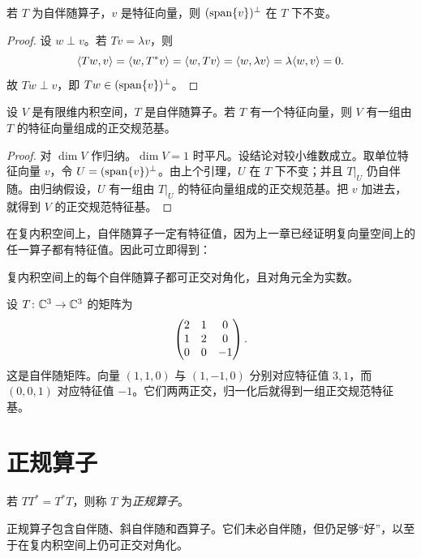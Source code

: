 \begin{lemma}
若 $T$ 为自伴随算子，$v$ 是特征向量，则 $(\operatorname{span}\{v\})^\perp$ 在 $T$ 下不变。
\end{lemma}

\begin{proof}
设 $w\perp v$。若 $Tv=\lambda v$，则
\[
\langle Tw, v \rangle=\langle w, T^*v \rangle=\langle w, Tv \rangle=\langle w, \lambda v \rangle=\lambda\langle w, v \rangle=0.
\]
故 $Tw\perp v$，即 $Tw\in(\operatorname{span}\{v\})^\perp$。
\end{proof}

\begin{theorem}[实谱定理的归纳核心]
设 $V$ 是有限维内积空间，$T$ 是自伴随算子。若 $T$ 有一个特征向量，则 $V$ 有一组由 $T$ 的特征向量组成的正交规范基。
\end{theorem}

\begin{proof}
对 $\dim V$ 作归纳。$\dim V=1$ 时平凡。设结论对较小维数成立。取单位特征向量 $v$，令 $U=(\operatorname{span}\{v\})^\perp$。由上个引理，$U$ 在 $T$ 下不变；并且 $T|_U$ 仍自伴随。由归纳假设，$U$ 有一组由 $T|_U$ 的特征向量组成的正交规范基。把 $v$ 加进去，就得到 $V$ 的正交规范特征基。
\end{proof}

在复内积空间上，自伴随算子一定有特征值，因为上一章已经证明复向量空间上的任一算子都有特征值。因此可立即得到：

\begin{corollary}
复内积空间上的每个自伴随算子都可正交对角化，且对角元全为实数。
\end{corollary}

\begin{example}
设 $T\colon\mathbb{C}^3\to\mathbb{C}^3$ 的矩阵为
\[
\begin{pmatrix} 2&1&0\\1&2&0\\0&0&-1 \end{pmatrix}.
\]
这是自伴随矩阵。向量 $(1,1,0)$ 与 $(1,-1,0)$ 分别对应特征值 $3,1$，而 $(0,0,1)$ 对应特征值 $-1$。它们两两正交，归一化后就得到一组正交规范特征基。
\end{example}

\section{正规算子}

\begin{definition}
若 $TT^*=T^*T$，则称 $T$ 为\emph{正规算子}。
\end{definition}

正规算子包含自伴随、斜自伴随和酉算子。它们未必自伴随，但仍足够“好”，以至于在复内积空间上仍可正交对角化。

